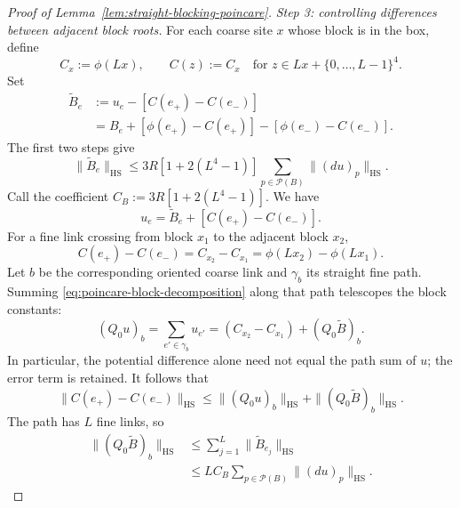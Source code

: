 \documentclass[10pt,reqno]{amsart}
\theoremstyle{definition}
\theoremstyle{remark}
\numberwithin{equation}{section}
\numberwithin{figure}{section}
\begin{document}
\begin{proof}[Proof of Lemma~\ref{lem:straight-blocking-poincare}]
\emph{Step 3: controlling differences between adjacent block roots.}
For each coarse site $x$ whose block is in the box, define
\begin{equation}\label{eq:poincare-block-constant}
C_x:=\phi(Lx),\qquad C(z):=C_x\quad
\text{for }z\in Lx+\{0,\ldots,L-1\}^4.
\end{equation}
Set
\begin{equation}\label{eq:poincare-new-error}
\begin{aligned}
\widetilde B_e&:=u_e-[C(e_+)-C(e_-)]\\
&=B_e+[\phi(e_+)-C(e_+)]-[\phi(e_-)-C(e_-)].
\end{aligned}
\end{equation}
The first two steps give
\begin{equation}\label{eq:poincare-new-error-bound}
\|\widetilde B_e\|_{\mathrm{HS}}
\le3R[1+2(L^4-1)]\sum_{p\in\mathcal P(B)}\|(du)_p\|_{\mathrm{HS}}.
\end{equation}
Call the coefficient $C_B:=3R[1+2(L^4-1)]$. We have
\begin{equation}\label{eq:poincare-block-decomposition}
u_e=\widetilde B_e+[C(e_+)-C(e_-)].
\end{equation}
For a fine link crossing from block $x_1$ to the adjacent block $x_2$,
\begin{equation}\label{eq:poincare-root-difference}
C(e_+)-C(e_-)=C_{x_2}-C_{x_1}=\phi(Lx_2)-\phi(Lx_1).
\end{equation}
Let $b$ be the corresponding oriented coarse link and $\gamma_b$ its
straight fine path. Summing \eqref{eq:poincare-block-decomposition} along
that path telescopes the block constants:
\begin{equation}\label{eq:poincare-coarse-sum}
(Q_0u)_b=\sum_{e'\in\gamma_b}u_{e'}
=(C_{x_2}-C_{x_1})+(Q_0\widetilde B)_b.
\end{equation}
In particular, the potential difference alone need not equal the path
sum of $u$; the error term is retained. It follows that
\begin{equation}\label{eq:poincare-root-bound}
\|C(e_+)-C(e_-)\|_{\mathrm{HS}}
\le\|(Q_0u)_b\|_{\mathrm{HS}}+\|(Q_0\widetilde B)_b\|_{\mathrm{HS}}.
\end{equation}
The path has $L$ fine links, so
\begin{equation}\label{eq:poincare-coarse-error-bound}
\begin{aligned}
\|(Q_0\widetilde B)_b\|_{\mathrm{HS}}
&\le\sum_{j=1}^L\|\widetilde B_{e_j}\|_{\mathrm{HS}}\\
&\le LC_B\sum_{p\in\mathcal P(B)}\|(du)_p\|_{\mathrm{HS}}.

\end{aligned}
\end{equation}
\end{proof}
\end{document}
